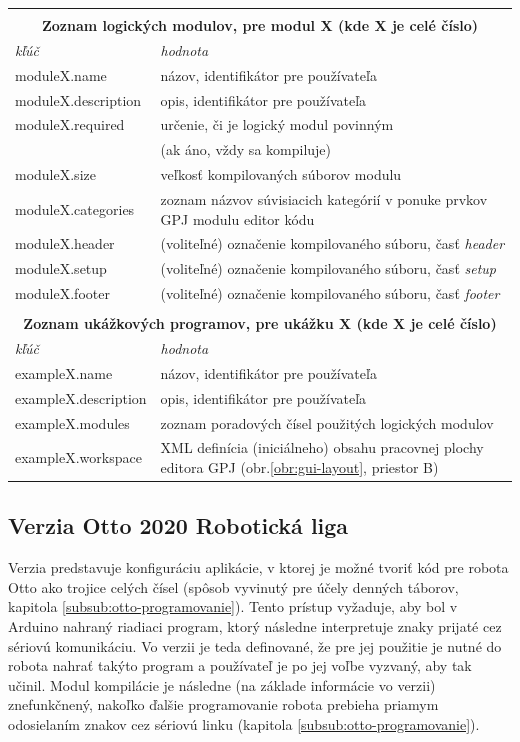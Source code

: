 \begin{table}
\begin{tabular}{ |p{3.8cm}|p{10cm}|  }
 \multicolumn{2}{c}{} \\
 \multicolumn{2}{c}{\textbf{Zoznam logických modulov, pre modul X (kde X je celé číslo)}} \\
 \hline
	\textit{kľúč} & \textit{hodnota}\\
 \hline
	moduleX.name&názov, identifikátor pre používateľa\\
	moduleX.description&opis, identifikátor pre používateľa\\
	moduleX.required&určenie, či je logický modul povinným\\
	&(ak áno, vždy sa kompiluje)\\
	moduleX.size&veľkosť kompilovaných súborov modulu\\
	moduleX.categories&zoznam názvov súvisiacich kategórií v ponuke prvkov GPJ modulu editor kódu\\
	moduleX.header&(voliteľné) označenie kompilovaného súboru, časť \textit{header}\\
	moduleX.setup&(voliteľné) označenie kompilovaného súboru, časť \textit{setup}\\
	moduleX.footer&(voliteľné) označenie kompilovaného súboru, časť \textit{footer}\\
 \hline

 \multicolumn{2}{c}{} \\
 \multicolumn{2}{c}{\textbf{Zoznam ukážkových programov, pre ukážku X (kde X je celé číslo)}} \\
 \hline
	\textit{kľúč} & \textit{hodnota}\\
 \hline
	exampleX.name&názov, identifikátor pre používateľa\\
	exampleX.description&opis, identifikátor pre používateľa\\
	exampleX.modules&zoznam poradových čísel použitých logických modulov\\
	exampleX.workspace&XML definícia (iniciálneho) obsahu pracovnej plochy editora GPJ (obr.\ref{obr:gui-layout}, priestor B)\\
 \hline
\end{tabular}
\end{table}\normalsize

\subsection{Verzia Otto 2020 Robotická liga}
Verzia predstavuje konfiguráciu aplikácie, v ktorej je možné tvoriť kód pre robota Otto ako trojice celých čísel (spôsob vyvinutý pre účely denných táborov, kapitola \ref{subsub:otto-programovanie}). Tento prístup vyžaduje, aby bol v Arduino nahraný  riadiaci program, ktorý následne interpretuje znaky prijaté cez sériovú komunikáciu. Vo verzii je teda definované, že pre jej použitie je nutné do robota nahrať takýto program a používateľ je po jej voľbe vyzvaný, aby tak učinil. Modul kompilácie je následne (na základe informácie vo verzii) znefunkčnený, nakoľko ďalšie programovanie robota prebieha priamym odosielaním znakov cez sériovú linku (kapitola \ref{subsub:otto-programovanie}).


